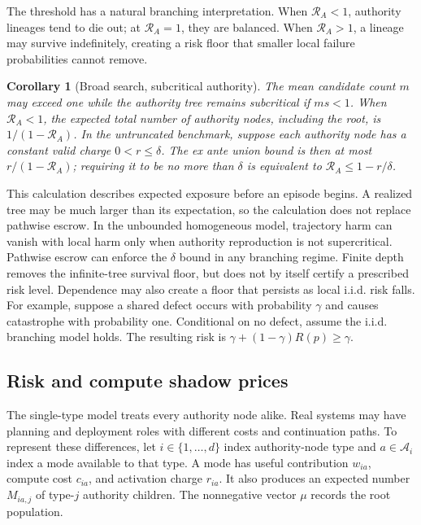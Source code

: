 \documentclass[sigconf,nonacm]{acmart}
\newtheorem{corollary}{Corollary}
\newcommand{\RA}{\mathcal{R}_{\!A}}
\begin{document}
The threshold has a natural branching interpretation.  When $\RA<1$, authority lineages tend to
die out; at $\RA=1$, they are balanced.  When $\RA>1$, a lineage may survive indefinitely, creating
a risk floor that smaller local failure probabilities cannot remove.

\begin{corollary}[Broad search, subcritical authority]
The mean candidate count $m$ may exceed one while the authority tree remains subcritical if
$ms<1$.  When $\RA<1$, the expected total number of authority nodes, including the root, is
$1/(1-\RA)$.  In the untruncated benchmark, suppose each authority node has a constant valid
charge $0<r\leq\delta$.  The ex ante union bound is then at most $r/(1-\RA)$; requiring it to be
no more than $\delta$ is equivalent to $\RA\leq1-r/\delta$.
\end{corollary}

This calculation describes expected exposure before an episode begins.  A realized tree may be
much larger than its expectation, so the calculation does not replace pathwise escrow.  In the
unbounded homogeneous model, trajectory harm can vanish with local harm only when authority
reproduction is not supercritical.  Pathwise escrow can enforce the $\delta$ bound in any branching
regime.  Finite depth removes the infinite-tree survival floor, but does not by itself certify a
prescribed risk level.  Dependence may also create a floor that persists as local i.i.d. risk falls.
For example, suppose a shared defect occurs with probability $\gamma$ and causes catastrophe with
probability one.  Conditional on no defect, assume the i.i.d. branching model holds.  The resulting
risk is $\gamma+(1-\gamma)R(p)\geq\gamma$.

\subsection{Risk and compute shadow prices}

The single-type model treats every authority node alike.  Real systems may have planning and
deployment roles with different costs and continuation paths.  To represent these differences, let
$i\in\{1,\ldots,d\}$ index authority-node type and $a\in\mathcal A_i$ index a mode available to
that type.  A mode has useful contribution $w_{ia}$, compute cost $c_{ia}$, and activation charge
$r_{ia}$.  It also produces an expected number $M_{ia,j}$ of type-$j$ authority children.  The
nonnegative vector $\mu$ records the root population.
\end{document}
